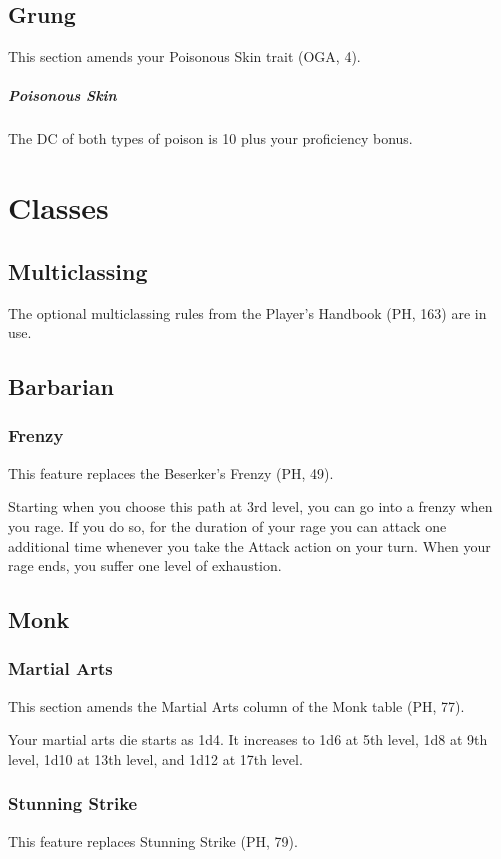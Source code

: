 \documentclass[letterpaper,twocolumn,openany,nodeprecatedcode]{dndbook}
\begin{document}
\subsection{Grung}
This section amends your Poisonous Skin trait (OGA, 4).

\subparagraph{Poisonous Skin} The DC of both types of poison is 10 plus your proficiency bonus.




\section{Classes}

\subsection{Multiclassing}
The optional multiclassing rules from the Player's Handbook (PH, 163) are in use.

\subsection{Barbarian}

\subsubsection{Frenzy}
This feature replaces the Beserker's Frenzy (PH, 49).

Starting when you choose this path at 3rd level, you can go into a frenzy when you rage. If you do so, for the duration of your rage you can attack one additional time whenever you take the Attack action on your turn. When your rage ends, you suffer one level of exhaustion.

\subsection{Monk}

\subsubsection{Martial Arts}
This section amends the Martial Arts column of the Monk table (PH, 77).

Your martial arts die starts as 1d4. It increases to 1d6 at 5th level, 1d8 at 9th level, 1d10 at 13th level, and 1d12 at 17th level.

\subsubsection{Stunning Strike}
This feature replaces Stunning Strike (PH, 79).
\end{document}
